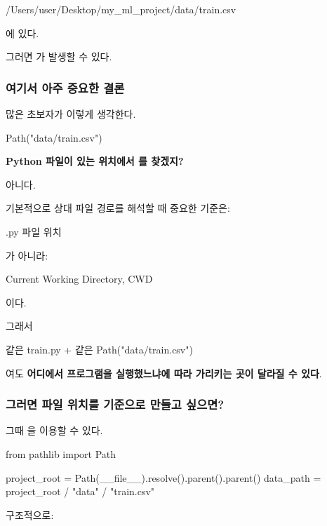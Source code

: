 \begin{dhkzsh}
/Users/user/Desktop/my_ml_project/data/train.csv
\end{dhkzsh}

에 있다.

그러면 가 발생할 수 있다.

\subsubsection{여기서 아주 중요한 결론}

많은 초보자가 이렇게 생각한다.

\begin{dhkcode}
Path("data/train.csv")
\end{dhkcode}

\textbf{Python 파일이 있는 위치에서 를 찾겠지?}

아니다.

기본적으로 상대 파일 경로를 해석할 때 중요한 기준은:

\begin{dhksmry}[centered]
.py 파일 위치
\end{dhksmry}

가 아니라:

\begin{dhksmry}[centered]
Current Working Directory, CWD
\end{dhksmry}

이다.

그래서

\begin{dhksmry}[centered]
같은 train.py
+
같은 Path("data/train.csv")
\end{dhksmry}

여도 \textbf{어디에서 프로그램을 실행했느냐에 따라 가리키는 곳이 달라질 수 있다}.

\subsubsection{그러면 파일 위치를 기준으로 만들고 싶으면?}

그때 을 이용할 수 있다.

\begin{dhkcode}
from pathlib import Path

project_root = Path(__file__).resolve().parent().parent()
data_path = project_root / "data" / "train.csv"
\end{dhkcode}

구조적으로:

